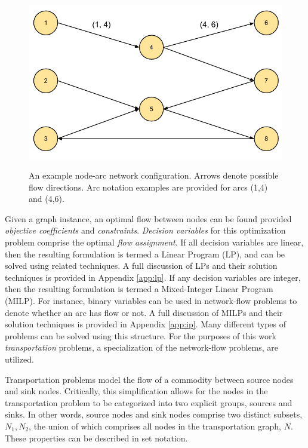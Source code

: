 \begin{figure}[H]
  \begin{center}
    \includegraphics[height=7.5cm]{./chapters/1-intro/figs/node-arcs.png}
  \caption{An example node-arc network configuration. Arrows denote possible
    flow directions. Arc notation examples are provided for arcs (1,4) and
    (4,6).}
  \label{fig:node-arcs}
  \end{center}
\end{figure}

Given a graph instance, an optimal flow between nodes can be found provided
\textit{objective coefficients} and \textit{constraints}. \textit{Decision
  variables} for this optimization problem comprise the optimal \textit{flow
  assignment}. If all decision variables are linear, then the resulting
formulation is termed a Linear Program (LP), and can be solved using related
techniques. A full discussion of LPs and their solution techniques is provided
in Appendix \ref{app:lp}. If any decision variables are integer, then the
resulting formulation is termed a Mixed-Integer Linear Program (MILP). For
instance, binary variables can be used in network-flow problems to denote
whether an arc has flow or not. A full discussion of MILPs and their solution
techniques is provided in Appendix \ref{app:ip}. Many different types of
problems can be solved using this structure. For the purposes of this work
\textit{transportation} problems, a specialization of the network-flow problems,
are utilized.

Transportation problems model the flow of a commodity between source nodes and
sink nodes. Critically, this simplification allows for the nodes in the
transportation problem to be categorized into two explicit groups, sources and
sinks. In other words, source nodes and sink nodes comprise two distinct
subsets, $N_1, N_2$, the union of which comprises all nodes in the
transportation graph, $N$. These properties can be described in set notation.

